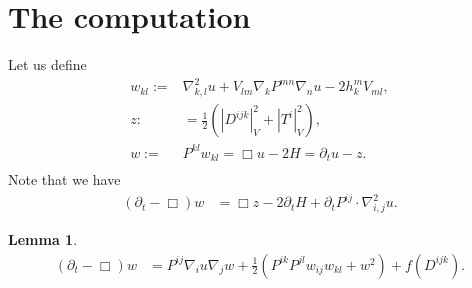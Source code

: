 \documentclass{amsart}
\newtheorem{lemma}[theorem]{Lemma}
\theoremstyle{definition}
\theoremstyle{remark}
\numberwithin{equation}{section}
\begin{document}
\section{The computation}
Let us define
\begin{align*}
w_{kl}:=&\nabla^2_{k,l}u+V_{lm}\nabla_kP^{mn}\nabla_nu-2h_k^mV_{ml},\\
z:&=\frac{1}{2}\left(\left|D^{ijk}\right|^2_V+\left|T^i\right|_V^2\right),\\
w:=&P^{kl}w_{kl}=\Box u-2H=\partial_tu-z.\\
\end{align*}
Note that we have
\begin{align*}
(\partial_t-\Box)w
&=\Box z-2\partial_tH+\partial_tP^{ij}\cdot\nabla^2_{i,j}u.
\end{align*}
\begin{lemma}
\begin{align*}
(\partial_t-\Box)w&=P^{ij}\nabla_i u\nabla_j w+ \frac{1}{2}\left(P^{ik}P^{jl}w_{ij}w_{kl}+w^2\right)+f(D^{ijk}).\\
\end{align*}
\end{lemma}
\end{document}
